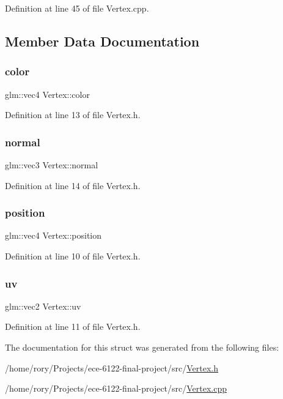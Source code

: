 Definition at line 45 of file Vertex.\+cpp.



\subsection{Member Data Documentation}
\mbox{\label{struct_vertex_aa7ecd21578677765699b8831e0011696}} 
\subsubsection{\texorpdfstring{color}{color}}
{\footnotesize\ttfamily glm\+::vec4 Vertex\+::color}



Definition at line 13 of file Vertex.\+h.

\mbox{\label{struct_vertex_a3aa35fe84025ecf1acccb5f65f5577fd}} 
\subsubsection{\texorpdfstring{normal}{normal}}
{\footnotesize\ttfamily glm\+::vec3 Vertex\+::normal}



Definition at line 14 of file Vertex.\+h.

\mbox{\label{struct_vertex_a6814af2586248942604e8edd28d950a9}} 
\subsubsection{\texorpdfstring{position}{position}}
{\footnotesize\ttfamily glm\+::vec4 Vertex\+::position}



Definition at line 10 of file Vertex.\+h.

\mbox{\label{struct_vertex_a8d5cc8548016889746f251d98377ec8a}} 
\subsubsection{\texorpdfstring{uv}{uv}}
{\footnotesize\ttfamily glm\+::vec2 Vertex\+::uv}



Definition at line 11 of file Vertex.\+h.



The documentation for this struct was generated from the following files\+:\begin{DoxyCompactItemize}
\item 
/home/rory/\+Projects/ece-\/6122-\/final-\/project/src/\hyperlink{_vertex_8h}{Vertex.\+h}\item 
/home/rory/\+Projects/ece-\/6122-\/final-\/project/src/\hyperlink{_vertex_8cpp}{Vertex.\+cpp}\end{DoxyCompactItemize}
